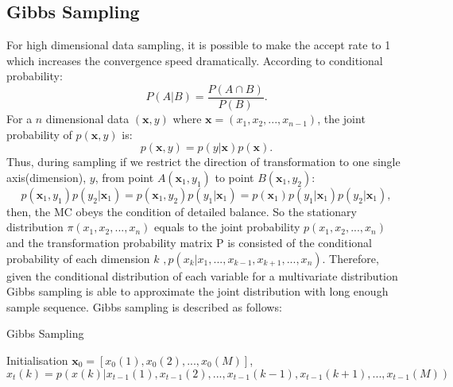 \documentclass[11pt,twoside,a4paper]{article}
\begin{document}
\subsection{Gibbs Sampling}
	For high dimensional data sampling, it is possible to make the accept rate to 1 which increases the convergence speed dramatically.
	According to conditional probability:
	\begin{equation}
		P(A|B) = \frac{P(A \cap B)}{P(B)}.
	\end{equation}
	For a $ n $ dimensional data $ (\mathbf{x}, y) $ where $ \mathbf{x}=(x_1,x_2,...,x_{n-1}) $, the joint probability of $p(\mathbf{x},y)$ is:
	\begin{equation}
		p(\mathbf{x},y) = p(y|\mathbf{x})p(\mathbf{x}).
	\end{equation}
	Thus, during sampling if we restrict the direction of transformation to one single axis(dimension), $ y $, from point $ A(\mathbf{x}_1, y_1) $ to point $ B(\mathbf{x}_1, y_2)$:
	\begin{equation}
		p(\mathbf{x}_1, y_1)p(y_2|\mathbf{x}_1) = p(\mathbf{x}_1, y_2)p(y_1|\mathbf{x}_1) = p(\mathbf{x}_1)p(y_1|\mathbf{x}_1)p(y_2|\mathbf{x}_1),
	\end{equation}
	then, the MC obeys the condition of detailed balance.
	So the stationary distribution $ \pi(x_1,x_2,...,x_n) $ equals to the joint probability $ p(x_1,x_2,...,x_n) $ and the transformation probability matrix P is consisted of the conditional probability of each dimension $ k $ $,  p(x_k|x_1,...,x_{k-1},x_{k+1},...,x_n) $.
	Therefore, given the conditional distribution of each variable for a multivariate distribution Gibbs sampling is able to approximate the joint distribution with long enough sample sequence.
	Gibbs sampling is described as follows:
	\begin{algorithm}[h]
	  \caption{Gibbs Sampling}
	  \label{alg:gibbs}
	  \begin{algorithmic}
	  	
	    \State Initialisation $\mathbf{x}_0 = [x_0(1),x_0(2),...,x_0(M)]$,  
	    		\State $ x_t(k) = p(x(k)|x_{t-1}(1),x_{t-1}(2),...,x_{t-1}(k-1),x_{t-1}(k+1),...,x_{t-1}(M))$\\
			\EndFor
		\EndFor
	  \end{algorithmic}
	\end{algorithm}
	
\end{document}
